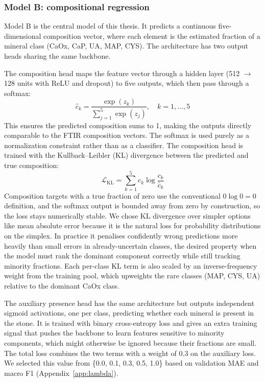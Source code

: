 \documentclass[10pt,twocolumn]{article}
\begin{document}
\subsubsection*{Model B: compositional regression}

Model B is the central model of this thesis. It predicts a continuous five-dimensional composition vector, where each element is the estimated fraction of a mineral class (CaOx, CaP, UA, MAP, CYS). The architecture has two output heads sharing the same backbone.

The composition head maps the feature vector through a hidden layer (512 $\to$ 128 units with ReLU and dropout) to five outputs, which then pass through a softmax:
\begin{equation}
    \hat{c}_k = \frac{\exp(z_k)}{\sum_{j=1}^{5} \exp(z_j)}, \quad k = 1, \ldots, 5
\end{equation}
This ensures the predicted composition sums to 1, making the outputs directly comparable to the FTIR composition vectors. The softmax is used purely as a normalization constraint rather than as a classifier.
The composition head is trained with the Kullback--Leibler (KL) divergence between the predicted and true composition:
\begin{equation}
    \mathcal{L}_{\text{KL}} = \sum_{k=1}^{5} c_k \log \frac{c_k}{\hat{c}_k}
\end{equation}
Composition targets with a true fraction of zero use the conventional $0 \log 0 = 0$ definition, and the softmax output is bounded away from zero by construction, so the loss stays numerically stable. We chose KL divergence over simpler options like mean absolute error because it is the natural loss for probability distributions on the simplex. In practice it penalises confidently wrong predictions more heavily than small errors in already-uncertain classes, the desired property when the model must rank the dominant component correctly while still tracking minority fractions. Each per-class KL term is also scaled by an inverse-frequency weight from the training pool, which upweights the rare classes (MAP, CYS, UA) relative to the dominant CaOx class.

The auxiliary presence head has the same architecture but outputs independent sigmoid activations, one per class, predicting whether each mineral is present in the stone. It is trained with binary cross-entropy loss and gives an extra training signal that pushes the backbone to learn features sensitive to minority components, which might otherwise be ignored because their fractions are small. The total loss combines the two terms with a weight of 0.3 on the auxiliary loss. We selected this value from \{0.0, 0.1, 0.3, 0.5, 1.0\} based on validation MAE and macro F1 (Appendix~\ref{app:lambda}).
\end{document}
